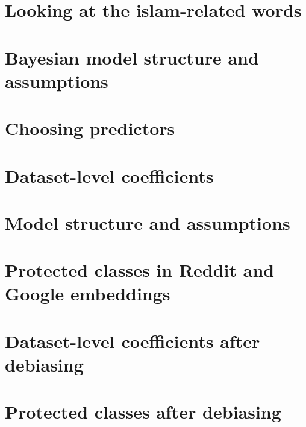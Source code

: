 \documentclass[
  12pt,
]{book}
\begin{document}
\hypertarget{looking-at-the-islam-related-words}{%
\section{Looking at the islam-related words}\label{looking-at-the-islam-related-words}}

\hypertarget{bayesian-model-structure-and-assumptions}{%
\section{Bayesian model structure and assumptions}\label{bayesian-model-structure-and-assumptions}}

\hypertarget{choosing-predictors}{%
\section{Choosing predictors}\label{choosing-predictors}}

\hypertarget{dataset-level-coefficients}{%
\section{Dataset-level coefficients}\label{dataset-level-coefficients}}

\hypertarget{model-structure-and-assumptions}{%
\section{Model structure and assumptions}\label{model-structure-and-assumptions}}

\hypertarget{protected-classes-in-reddit-and-google-embeddings}{%
\section{Protected classes in Reddit and Google embeddings}\label{protected-classes-in-reddit-and-google-embeddings}}

\hypertarget{dataset-level-coefficients-after-debiasing}{%
\section{Dataset-level coefficients after debiasing}\label{dataset-level-coefficients-after-debiasing}}

\hypertarget{protected-classes-after-debiasing}{%
\section{Protected classes after debiasing}\label{protected-classes-after-debiasing}}
\end{document}
